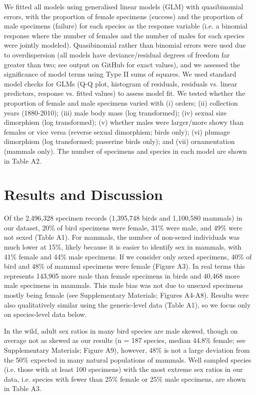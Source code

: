 \documentclass[a4paper, 12pt]{article}
\begin{document}
We fitted all models using generalised linear models (GLM) with quasibinomial errors, with the proportion of female specimens (success) and the proportion of male specimens (failure) for each species as the response variable (i.e. a binomial response where the number of females and the number of males for each species were jointly modeled). 
Quasibinomial rather than binomial errors were used due to overdispersion (all models have deviance/residual degrees of freedom far greater than two; see output on GitHub for exact values), and we assessed the significance of model terms using Type II sums of squares. 
We used standard model checks for GLMs (Q-Q plot, histogram of residuals, residuals vs. linear predictors, response vs. fitted values) to assess model fit. 
We tested whether the proportion of female and male specimens varied with (i) orders; (ii) collection years (1880-2010); (iii) male body mass (log transformed); (iv) sexual size dimorphism (log transformed); (v) whether males were larger/more showy than females or vice versa (reverse sexual dimorphism; birds only); (vi) plumage dimorphism (log transformed; passerine birds only); and (vii) ornamentation (mammals only). 
The number of specimens and species in each model are shown in Table A2.

\section{Results and Discussion}

Of the 2,496,328 specimen records (1,395,748 birds and 1,100,580 mammals) in our dataset, 20\% of bird specimens were female, 31\% were male, and 49\% were not sexed (Table A1). 
For mammals, the number of non-sexed individuals was much lower at 15\%, likely because it is easier to identify sex in mammals, with 41\% female and 44\% male specimens. 
If we consider only sexed specimens, 40\% of bird and 48\% of mammal specimens were female (Figure A3). 
In real terms this represents 143,905 more male than female specimens in birds and 40,468 more male specimens in mammals. 
This male bias was not due to unsexed specimens mostly being female (see Supplementary Materials; Figures A4-A8).
Results were also qualitatively similar using the generic-level data (Table A1), so we focus only on species-level data below.

In the wild, adult sex ratios in many bird species are male skewed, though on average not as skewed as our results (n = 187 species, median 44.8\% female\cite{szekely2014sex}; see Supplementary Materials; Figure A9), however, 48\% is not a large deviation from the 50\% expected in many natural populations of mammals\cite{karlin1986theoretical}.
Well sampled species (i.e. those with at least 100 specimens) with the most extreme sex ratios in our data, i.e. species with fewer than 25\% female or 25\% male specimens, are shown in Table A3.
\end{document}
